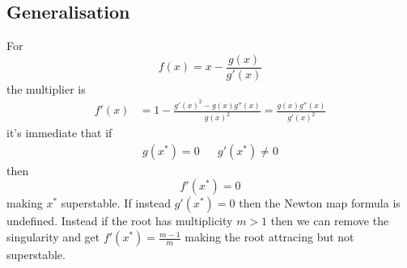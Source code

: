 \subsection{Generalisation}
For 
\begin{equation}
    f(x) = x-\frac{g(x)}{g'(x)}
\end{equation}
the multiplier is 
\begin{align}
    f'(x) &= 1-\frac{g'(x)^2-g(x)g''(x)}{g(x)^2} = \frac{g(x)g''(x)}{g'(x)^2}
\end{align}
it's immediate that if
\begin{align}
    g(x^*)=0 && g'(x^*)\neq0
\end{align}
then 
\begin{equation}
    f'(x^*)=0
\end{equation}
making \(x^*\) superstable. If instead \(g'(x^*)=0\) then the Newton map formula is undefined. Instead if the root has multiplicity \(m>1\) then we can remove the singularity and get \(f'(x^*)=\frac{m-1}{m}\) making the root attracing but not superstable.